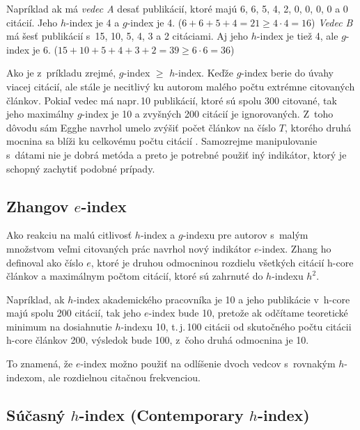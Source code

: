 Napríklad ak má \emph{vedec A} desať publikácií, ktoré majú 6, 6, 5, 4, 2, 0, 0,
0, 0 a 0 citácií.  Jeho $h$-index je 4 a $g$-index je 4.
($6+6+5+4 = 21 \geq 4\cdot4=16$) \emph{Vedec B} má šesť publikácií s~15, 10, 5,
4, 3 a 2 citáciami.  Aj jeho $h$-index je tiež 4, ale $g$-index je 6.
($15+10+5+4+3+2 = 39 \geq 6\cdot6 = 36$)

Ako je z~príkladu zrejmé, $g$-index $\geq$ $h$-index.  Keďže $g$-index berie do
úvahy viacej citácií, ale stále je necitlivý ku autorom malého počtu extrémne
citovaných článkov.  Pokiaľ vedec má napr.\,10 publikácií, ktoré sú spolu 300
citované, tak jeho maximálny $g$-index je 10 a zvyšných 200 citácií je
ignorovaných.  Z~toho dôvodu sám Egghe navrhol umelo zvýšiť počet článkov na
číslo $T$, ktorého druhá mocnina sa blíži ku celkovému počtu citácií
\citep{Egghe2006}.  Samozrejme manipulovanie s~dátami nie je dobrá metóda a
preto je potrebné použiť iný indikátor, ktorý je schopný zachytiť podobné
prípady.


\subsection{Zhangov $e$-index}
\label{sec:e-index}

Ako reakciu na malú citlivosť $h$-index a $g$-indexu pre autorov s~malým
množstvom veľmi citovaných prác \citet{Zhang2009} navrhol nový indikátor
$e$-index.  Zhang ho definoval ako číslo $e$, ktoré je druhou odmocninou
rozdielu všetkých citácií h-core článkov a maximálnym počtom citácií, ktoré sú
zahrnuté do $h$-indexu $h^2$.

Napríklad, ak $h$-index akademického pracovníka je 10 a jeho publikácie v~h-core
majú spolu 200 citácií, tak jeho $e$-index bude 10, pretože ak odčítame
teoretické minimum na dosiahnutie $h$-indexu 10, t.\,j.\,100 citácii od
skutočného počtu citácii h-core článkov 200, výsledok bude 100, z~čoho druhá
odmocnina je 10.

To znamená, že $e$-index možno použiť na odlíšenie dvoch vedcov s~rovnakým
$h$-indexom, ale rozdielnou citačnou frekvenciou.


\subsection{Súčasný $h$-index (Contemporary $h$-index)}
\label{sec:hc-index}


